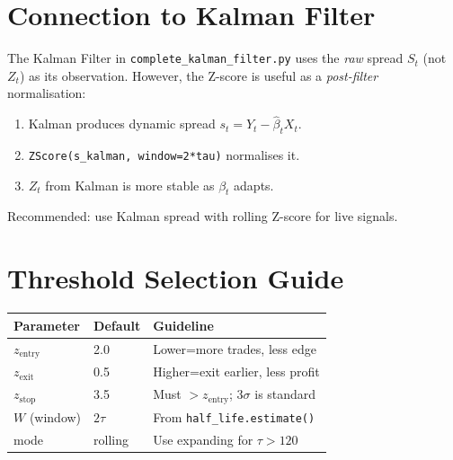 \documentclass[10pt,a4paper,twocolumn]{article}
\begin{document}
\section{Connection to Kalman Filter}

\begin{tcolorbox}[notebox={ZScore $\to$ Kalman Interface}]
The Kalman Filter in \texttt{complete\_kalman\_filter.py} uses the
\emph{raw} spread $S_t$ (not $Z_t$) as its observation.  However,
the Z-score is useful as a \emph{post-filter} normalisation:
\begin{enumerate}\setlength\itemsep{1pt}
  \item Kalman produces dynamic spread $s_t = Y_t - \hat\beta_t X_t$.
  \item \texttt{ZScore(s\_kalman, window=2*tau)} normalises it.
  \item $Z_t$ from Kalman is more stable as $\beta_t$ adapts.
\end{enumerate}
Recommended: use Kalman spread with rolling Z-score for live signals.
\end{tcolorbox}

\section{Threshold Selection Guide}

\begin{center}
{\small
\begin{tabular}{@{}p{1.4cm}p{1.4cm}p{2.6cm}@{}}
\toprule
Parameter & Default & Guideline\\
\midrule
$z_{\text{entry}}$ & 2.0 & Lower=more trades, less edge\\
$z_{\text{exit}}$ & 0.5 & Higher=exit earlier, less profit\\
$z_{\text{stop}}$ & 3.5 & Must $> z_{\text{entry}}$; 3$\sigma$ is standard\\
$W$ (window) & $2\tau$ & From \texttt{half\_life.estimate()}\\
mode & rolling & Use expanding for $\tau>120$\\
\bottomrule
\end{tabular}
}
\end{center}
\end{document}
